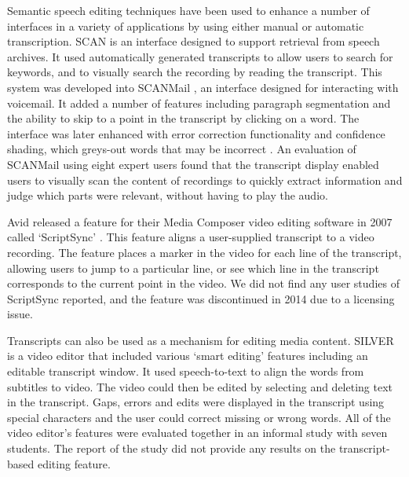 
Semantic speech editing techniques have been used to enhance a number of interfaces in a variety of applications by
using either manual or automatic transcription.
SCAN \citep{Whittaker1999} is an interface designed to support retrieval from speech archives. It used automatically
generated transcripts to allow users to search for keywords, and to visually search the recording by reading the
transcript. This system was developed into SCANMail \citep{Whittaker2002}, an interface designed for interacting with
voicemail. It added a number of features including paragraph segmentation and the ability to skip to a point in the
transcript by clicking on a word. The interface was later enhanced with error correction functionality and confidence
shading, which greys-out words that may be incorrect \citep{Burke2006}. An evaluation of SCANMail using eight expert
users found that the transcript display enabled users to visually scan the content of recordings to quickly extract
information and judge which parts were relevant, without having to play the audio.

Avid released a feature for their Media Composer video editing software in 2007 called `ScriptSync' \citep{Avid2011}.
This feature aligns a user-supplied transcript to a video recording. The feature places a marker in the video for each
line of the transcript, allowing users to jump to a particular line, or see which line in the transcript corresponds to
the current point in the video.  We did not find any user studies of ScriptSync reported, and the feature was
discontinued in 2014 due to a licensing issue.

Transcripts can also be used as a mechanism for editing media content.  \mbox{SILVER} \citep{Casares2002, Long2003} is
a video editor that included various `smart editing' features including an editable transcript window. It used
speech-to-text to align the words from subtitles to video. The video could then be edited by selecting and deleting
text in the transcript. Gaps, errors and edits were displayed in the transcript using special characters and the user
could correct missing or wrong words. All of the video editor's features were evaluated together in an informal study
with seven students. The report of the study did not provide any results on the transcript-based editing feature.

